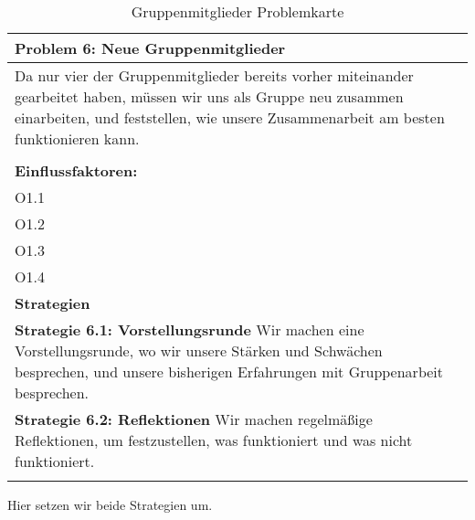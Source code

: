 \documentclass[fontsize=12pt,paper=a4,twoside]{scrartcl}
\begin{document}
\begin{table}[H]
    \centering
    \begin{tabular}{|p{15cm}|}
    \hline
          \textbf{Problem 6: Neue Gruppenmitglieder}  \\ \hline
	Da nur vier der Gruppenmitglieder bereits vorher miteinander gearbeitet haben, müssen wir uns als Gruppe neu zusammen einarbeiten, und feststellen, wie unsere Zusammenarbeit am besten funktionieren kann.\\
         \\ \hline
          \textbf{Einflussfaktoren: } \\
	O1.1 \\
	O1.2 \\
	O1.3 \\
	O1.4 \\
          \hline
          \textbf{Strategien} \\ \hline
            {}          
           \label{strategie:6.1}     
          \textbf{Strategie 6.1: Vorstellungsrunde} Wir machen eine Vorstellungsrunde, wo wir unsere Stärken und Schwächen besprechen, und unsere bisherigen Erfahrungen mit Gruppenarbeit besprechen. \\        
  {}          
           \label{strategie:6.2}              
          \textbf{Strategie 6.2: Reflektionen} Wir machen regelmäßige Reflektionen, um festzustellen, was funktioniert und was nicht funktioniert. \\
	 \\ \hline
    \end{tabular}

    \caption{Gruppenmitglieder Problemkarte}
    \label{tab:ProblemKarte6}
\end{table}
Hier setzen wir beide Strategien um. \\
\end{document}
